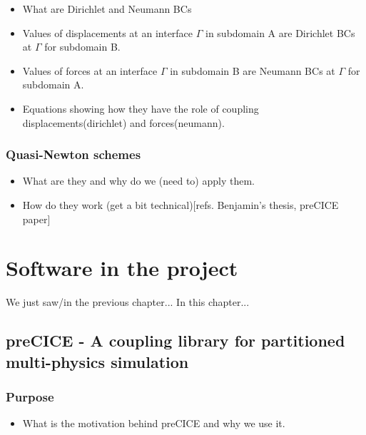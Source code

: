 \documentclass[a4paper, 11pt, oneside]{Thesis}  %
\begin{document}
            \begin{itemize}
                \item What are Dirichlet and Neumann BCs
                \item Values of displacements at an interface $\Gamma$ in subdomain A are Dirichlet BCs at $\Gamma$ for subdomain B.
                \item Values of forces at an interface $\Gamma$ in subdomain B are Neumann BCs at $\Gamma$ for subdomain A.
                \item Equations showing how they have the role of coupling displacements(dirichlet) and forces(neumann).
            \end{itemize}
        
        \subsection{Quasi-Newton schemes}
            
            \begin{itemize}
                \item What are they and why do we (need to) apply them.
                \item How do they work (get a bit technical)[refs. Benjamin's thesis, preCICE paper]
            \end{itemize}
   
   
\chapter{Software in the project}
    
    We just saw/in the previous chapter...
    In this chapter...
    
    \section{preCICE - A coupling library for partitioned multi-physics simulation}
        
        \subsection{Purpose}
        
        \begin{itemize}
            \item What is the motivation behind preCICE and why we use it.
        \end{itemize}
        
\end{document}
